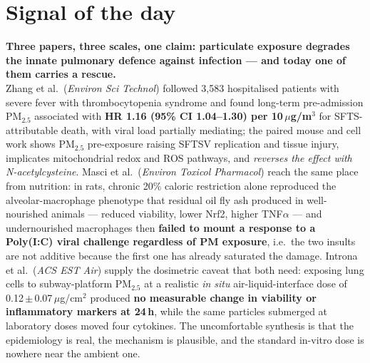 \documentclass[10pt]{article}
\begin{document}
\vspace{6mm}

\section*{\sffamily\bfseries\color{Deep}Signal of the day}
\vspace{-1.5mm}{\color{Amber}\rule{\linewidth}{1.1pt}}\vspace{2.5mm}

\begin{keybox}
{\sffamily\bfseries\small\color{Deep}Three papers, three scales, one claim: particulate
exposure degrades the innate pulmonary defence against infection --- and today one of them
carries a rescue.}\\[1.4mm]
\footnotesize
Zhang et al.\ (\textit{Environ Sci Technol}) followed 3{,}583 hospitalised patients with
severe fever with thrombocytopenia syndrome and found long-term pre-admission PM$_{2.5}$
associated with \textbf{HR 1.16 (95\% CI 1.04--1.30) per 10\,$\mu$g/m$^3$} for
SFTS-attributable death, with viral load partially mediating; the paired mouse and cell
work shows PM$_{2.5}$ pre-exposure raising SFTSV replication and tissue injury, implicates
mitochondrial redox and ROS pathways, and \emph{reverses the effect with
N-acetylcysteine}. Masci et al.\ (\textit{Environ Toxicol Pharmacol}) reach the same
place from nutrition: in rats, chronic 20\% caloric restriction alone reproduced the
alveolar-macrophage phenotype that residual oil fly ash produced in well-nourished
animals --- reduced viability, lower Nrf2, higher TNF$\alpha$ --- and undernourished
macrophages then \textbf{failed to mount a response to a Poly(I:C) viral challenge
regardless of PM exposure}, i.e.\ the two insults are not additive because the first one
has already saturated the damage. Introna et al.\ (\textit{ACS EST Air}) supply the
dosimetric caveat that both need: exposing lung cells to subway-platform PM$_{2.5}$ at a
realistic \emph{in situ} air-liquid-interface dose of 0.12\,$\pm$\,0.07\,$\mu$g/cm$^2$
produced \textbf{no measurable change in viability or inflammatory markers at 24\,h},
while the same particles submerged at laboratory doses moved four cytokines. The
uncomfortable synthesis is that the epidemiology is real, the mechanism is plausible, and
the standard in-vitro dose is nowhere near the ambient one.
\end{keybox}

\vspace{3mm}
\end{document}
